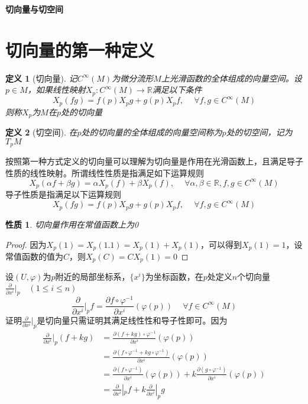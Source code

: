 \documentclass{article}
\newtheorem{definition}{定义}
\newtheorem{proposition}{性质}
\begin{document}
\begin{center}
    \LARGE
    \textbf{切向量与切空间}\\
    \vspace{0.2em}
    \large
\end{center}
\section{切向量的第一种定义}
\begin{definition}[切向量]
    记$C^{\infty}(M)$为微分流形$M$上光滑函数的全体组成的向量空间。设$p \in M$，如果线性映射$X_{p}:C^{\infty}(M) \to \mathbb{R}$满足以下条件
    $$
    X_{p}(fg) = f(p)X_{p}g+g(p)X_{p}f, \quad \ \forall f,g \in C^{\infty}(M)
    $$
    则称$X_p$为$M$在$p$处的切向量
\end{definition}
\begin{definition}[切空间]
    在$p$处的切向量的全体组成的向量空间称为$p$处的切空间，记为$T_{p}M$
\end{definition}
按照第一种方式定义的切向量可以理解为切向量是作用在光滑函数上，且满足导子性质的线性映射。所谓线性性质是指满足如下运算规则
$$
X_{p}(\alpha f + \beta g) = \alpha X_{p}(f)+\beta X_{p}(f), \quad \ \forall  \alpha,\beta \in \mathbb{R},f,g \in C^{\infty}(M)
$$
导子性质是指满足以下运算规则
$$
X_{p}(fg) = f(p)X_{p}g+g(p)X_{p}f, \quad \ \forall f,g \in C^{\infty}(M)
$$
\begin{proposition}
    切向量作用在常值函数上为0
\end{proposition}
\begin{proof}
    因为$X_{p}(1)=X_{p}(1.1)=X_{p}(1)+X_{p}(1)$，可以得到$X_{p}(1)=1$，设常值函数的值为$C$，则$X_{p}(C)=CX_{p}(1)=0$
\end{proof}
设$(U,\varphi)$为$p$附近的局部坐标系，$\{x^i\}$为坐标函数，在$p$处定义$n$个切向量$\frac{\partial}{\partial x^{i}}|_{p} \quad (1 \leq i \leq n)$
$$
\frac{\partial}{\partial x^{i}}|_{p}f=\frac{\partial f \circ \varphi^{-1}}{\partial x^{i}}(\varphi(p))\quad \ \forall f \in C^{\infty}(M)
$$
证明$\frac{\partial}{\partial x^{i}}|_{p}$是切向量只需证明其满足线性性和导子性即可。因为
$$
\begin{aligned}
\frac{\partial}{\partial x^{i}}|_{p}(f+kg)&=\frac{\partial(f+kg)\circ \varphi^{-1}}{\partial x^i}(\varphi (p))\\
&=\frac{\partial(f\circ \varphi^{-1}+kg\circ \varphi^{-1})}{\partial x^i}(\varphi (p))\\
&=\frac{\partial(f\circ \varphi^{-1})}{\partial x^i}(\varphi (p))+k\frac{\partial(g\circ \varphi^{-1})}{\partial x^i}(\varphi (p))\\
&=\frac{\partial}{\partial x^{i}}|_{p}f+k\frac{\partial}{\partial x^{i}}|_{p}g
\end{aligned}
$$
\end{document}
